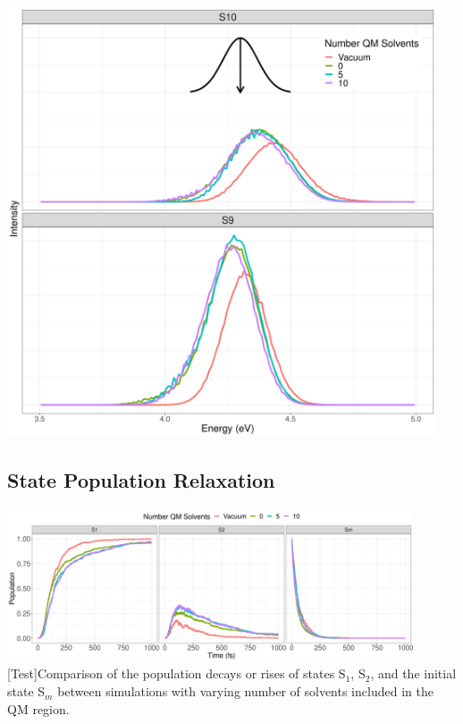 \noindent
\begin{minipage}[c]{\textwidth}
  \centering
  \includegraphics[width=5in]{../Paper2/Images/pulse_pump/spectra.png}
  \label{s1absorption}
\end{minipage}\bigskip

\subsection{State Population Relaxation}

\noindent
\begin{minipage}[c]{\textwidth}
  \centering
  \includegraphics[width=0.9\textwidth]{../Paper2/Images/populations/solvent_comparison.png}
  [Test]{Comparison of the population decays or rises of states S\(_1\), S\(_2\), and the initial state S\(_m\) between simulations with varying number of solvents included in the QM region.}
  \label{stateDecay}
\end{minipage}\bigskip

